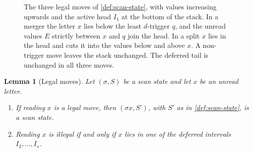 \documentclass[11pt,reqno]{amsart}
\newtheorem{lemma}[lemma]{Lemma}
\theoremstyle{definition}
\theoremstyle{remark}
\begin{document}
\begin{figure}[b]
\caption{The three legal moves of \cref{def:scan-state}, with values
increasing upwards and the active head $I_1$ at the bottom of the stack.
In a merger the letter $x$ lies below the least $d$-trigger $q$, and the
unread values $E$ strictly between $x$ and $q$ join the head.  In a split
$x$ lies in the head and cuts it into the values below and above $x$.  A
non-trigger move leaves the stack unchanged.  The deferred tail is unchanged
in all three moves.}
\label{fig:moves}
\end{figure}


\begin{lemma}[Legal moves]\label{lem:legal-moves}
Let $(\sigma,S)$ be a scan state and let $x$ be an unread letter.
\begin{enumerate}
\item[(a)] If reading $x$ is a legal move, then $(\sigma x,S')$, with $S'$
  as in \cref{def:scan-state}, is a scan state.
\item[(b)] Reading $x$ is illegal if and only if $x$ lies in one of the deferred
  intervals $I_2,\ldots,I_s$.
\end{enumerate}
\end{lemma}
\end{document}
